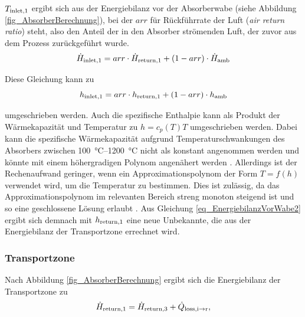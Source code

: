 $T_{\mathrm{inlet,}1}$ ergibt sich aus der Energiebilanz vor der Absorberwabe (siehe Abbildung \ref{fig_AbsorberBerechnung}), bei der $arr$ für Rückführrate der Luft (\textit{air return ratio}) steht, also den Anteil der in den Absorber strömenden Luft, der zuvor aus dem Prozess zurückgeführt wurde.
\begin{equation} \label{eq_EnergiebilanzVorWabe}
    \dot{H}_{\mathrm{inlet,}1} = arr \cdot \dot{H}_{\mathrm{return,}1} + (1-arr) \cdot \dot{H}_{\mathrm{amb}}
\end{equation}

Diese Gleichung kann zu
\begin{equation} \label{eq_EnergiebilanzVorWabe2}
    h_{\mathrm{inlet,}1} = arr \cdot h_{\mathrm{return,}1} + (1-arr) \cdot h_{\mathrm{amb}}
\end{equation}

\vspace*{-\baselineskip}umgeschrieben werden.
Auch die spezifische Enthalpie kann als Produkt der Wärmekapazität und Temperatur zu $h = c_p(T)T$ umgeschrieben werden.
Dabei kann die spezifische Wärmekapazität aufgrund Temperaturschwankungen des Absorbers zwischen \SIrange{100}{1200}{\degreeCelsius} nicht als konstant angenommen werden und könnte mit einem höhergradigen Polynom angenähert werden \cite{IdingSolarPaces}. Allerdings ist der Rechenaufwand geringer, wenn ein Approximationspolynom der Form $T=f(h)$ verwendet wird, um die Temperatur zu bestimmen.
Dies ist zulässig, da das Approximationspolynom im relevanten Bereich streng monoton steigend ist und so eine geschlossene Lösung erlaubt \cite[S.96]{DissGall}.
Aus Gleichung \ref{eq_EnergiebilanzVorWabe2} ergibt sich demnach mit $h_{\mathrm{return,}1}$ eine neue Unbekannte, die aus der Energiebilanz der Transportzone errechnet wird.


\subsubsection*{Transportzone} \label{subsubsec_EnergiebilanzTransportzone}
Nach Abbildung \ref{fig_AbsorberBerechnung} ergibt sich die Energiebilanz der Transportzone zu
\begin{equation} \label{eq_EnergiebilanzTransportzone}
\dot{H}_{\mathrm{return,}1} = \dot{H}_{\mathrm{return,}3} +\dot{Q}_{\mathrm{loss,i \to r}},
\end{equation}

